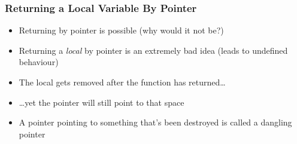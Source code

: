 \begin{frame}
  \frametitle{Returning a Local Variable By Pointer}
  \begin{itemize}
    \item Returning by pointer is possible (why would it not be?)
    \item Returning a \emph{local} by pointer is an extremely bad idea (leads to undefined behaviour)
    \item The local gets removed after the function has returned\dots
    \item \dots yet the pointer  will still point to that space
    \item A pointer pointing to something that's been destroyed is called a dangling pointer
  \end{itemize}
\end{frame}

